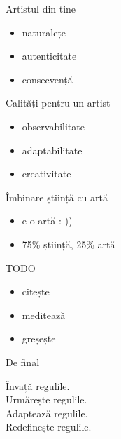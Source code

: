 \documentclass{beamer}
\begin{document}
\begin{frame}{Artistul din tine}
  \begin{itemize}
    \pause
    \item naturalețe
    \pause
    \item autenticitate
    \pause
    \item consecvență
  \end{itemize}
\end{frame}

\begin{frame}{Calități pentru un artist}
  \begin{itemize}
    \pause
    \item observabilitate
    \pause
    \item adaptabilitate
    \pause
    \item creativitate
  \end{itemize}
\end{frame}

\begin{frame}{Îmbinare știință cu artă}
  \begin{itemize}
    \item e o artă :-))
    \item 75\% știință, 25\% artă
  \end{itemize}
\end{frame}

\begin{frame}{TODO}
  \begin{itemize}
    \pause
    \item citește
    \pause
    \item meditează
    \pause
    \item greșește
  \end{itemize}
\end{frame}

\begin{frame}{De final}
  \begin{center}
    \pause
    Învață regulile.\\
    \vspace{0.5cm}
    \pause
    Urmărește regulile.\\
    \vspace{0.5cm}
    \pause
    Adaptează regulile.\\
    \vspace{0.5cm}
    \pause
    Redefinește regulile.
  \end{center}
\end{frame}
\end{document}
